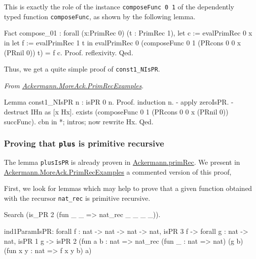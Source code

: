 This is exactly the role of the instance \texttt{composeFunc 0 1} of the dependently typed
function \texttt{composeFunc}, as shown by the following lemma.

\begin{Coqsrc}
Fact compose_01 :
    forall (x:PrimRec 0) (t : PrimRec 1),
    let c := evalPrimRec 0 x in
    let f := evalPrimRec 1 t in
    evalPrimRec 0 (composeFunc 0 1
                               (PRcons 0 0 x (PRnil 0))
                               t)  =
     f c.
Proof. reflexivity. Qed.
\end{Coqsrc}

Thus, we get a quite simple proof of \texttt{const1\_NIsPR}.


\vspace{4pt}
\noindent
\emph{From \href{../theories/html/hydras.Ackermann.MoreAck.PrimRecExamples.html}{Ackermann.MoreAck.PrimRecExamples}}.
\begin{Coqsrc}
Lemma  const1_NIsPR n : isPR 0 n. 
Proof.
  induction n.
  - apply zeroIsPR.
  - destruct IHn as [x Hx].
   exists (composeFunc 0 1 (PRcons 0 0 x (PRnil 0)) succFunc). 
   cbn in *; intros; now rewrite Hx.
Qed.
\end{Coqsrc}


\subsubsection{Proving that \texttt{plus} is primitive recursive}

The lemma \texttt{plusIsPR} is already proven in \href{../theories/html/hydras.Ackermann.primRec.html}{Ackermann.primRec}. We present in 
\href{../theories/html/hydras.Ackermann.MoreAck.PrimRecExamples.html}{Ackermann.MoreAck.PrimRecExamples}
a commented version of this proof, 

First, we look for lemmas which may help to prove that a given function obtained with the recursor \texttt{nat\_rec} is primitive recursive.

\begin{Coqsrc}
Search (is_PR 2 (fun _ _ => nat_rec _ _ _ _)).
\end{Coqsrc}

\begin{Coqanswer}
ind1ParamIsPR:
  forall f : nat -> nat -> nat -> nat,
  isPR 3 f ->
  forall g : nat -> nat,
  isPR 1 g ->
  isPR 2
    (fun a b : nat =>
     nat_rec (fun _ : nat => nat)
                 (g b) (fun x y : nat => f x y b) a)
\end{Coqanswer}

